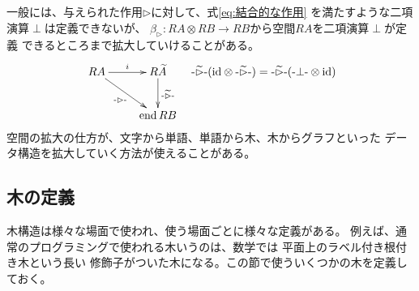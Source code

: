 		一般には、与えられた作用$\rhd$に対して、式\eqref{eq:結合的な作用}
		を満たすような二項演算$\perp$は定義できないが、
		$\beta_\rhd:RA\otimes RB\to RB$から空間$RA$を二項演算$\perp$が定義
		できるところまで拡大していけることがある。
		\begin{equation*}\begin{split} %
			\xymatrix{
				RA \ar[dr]_{\mybiop{\rhd}} \ar[r]^{i}
				& R\widetilde{A} \ar[d]^{\mybiop{\widetilde{\rhd}}} \\
				& \myop{end}RB \\
			} \quad
			\mybiop{\widetilde{\rhd}}(\myid\otimes\mybiop{\widetilde{\rhd}})
			=\mybiop{\widetilde{\rhd}}(\mybiop{\perp}\otimes\myid)
		\end{split}\end{equation*} %
		空間の拡大の仕方が、文字から単語、単語から木、木からグラフといった
		データ構造を拡大していく方法が使えることがある。

	\subsection{木の定義}\label{s2:木の定義} %
		木構造は様々な場面で使われ、使う場面ごとに様々な定義がある。
		例えば、通常のプログラミングで使われる木いうのは、数学では
		平面上のラベル付き根付き木\cite{arxiv:hoffman:0710.3739}という長い
		修飾子がついた木になる。この節で使ういくつかの木を定義しておく。

